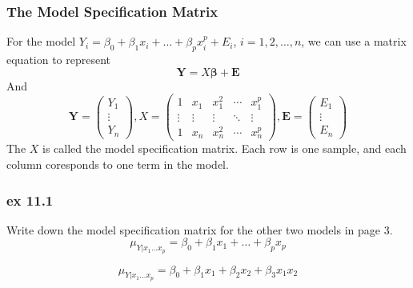 \documentclass{beamer}
\begin{document}
\begin{frame}
    \frametitle{The Model Specification Matrix}

    For the model $Y_i=\beta_0+\beta_1 x_i+\dots +\beta_p x_i^p + E_i$, $i=1,2,\dots , n$, we can use a matrix equation to represent
    \[\mathbf{Y}=X\boldsymbol{\beta}+\mathbf{E}\]
    And 
    \begin{equation*}      
        \mathbf{Y}=
        \left( 
          \begin{array}{ccc}  
        
            Y_1\\
            \vdots\\
            Y_n
          \end{array}
        \right)   
        , X=
        \left(
        \begin{array}{ccccc}
            1 & x_1 & x_1^2 & \cdots & x_1^p\\
            \vdots & \vdots & \vdots & \ddots & \vdots\\
            1 & x_n & x_n^2 & \cdots & x_n^p
        \end{array}
        \right)
        , \mathbf{E}=
        \left(
            \begin{array}{ccc}  
        
                E_1\\
                \vdots\\
                E_n
              \end{array}
        \right)
    \end{equation*}
    The $X$ is called the model specification matrix. Each row is one sample, and each column coresponds to one term in the model.

\end{frame}

\begin{frame}
    \frametitle{ex 11.1}

    Write down the model specification matrix for the other two models in page 3.
    \[\mu_{Y|x_1\dots x_p}=\beta_0+\beta_1 x_1+\dots +\beta_p x_p\]

    \[\mu_{Y|x_1\dots x_p}=\beta_0+\beta_1 x_1+\beta_2 x_2+\beta_3 x_1 x_2\]

\end{frame}
\end{document}
